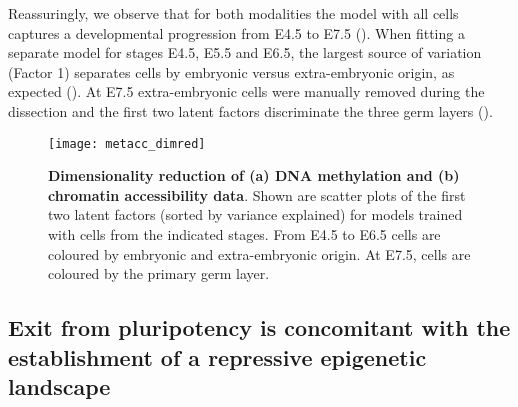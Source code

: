 
Reassuringly, we observe that for both modalities the model with all cells captures a developmental progression from E4.5 to E7.5 (). When fitting a separate model for stages E4.5, E5.5 and E6.5, the largest source of variation (Factor 1) separates cells by embryonic versus extra-embryonic origin, as expected (). At E7.5 extra-embryonic cells were manually removed during the dissection and the first two latent factors discriminate the three germ layers ().

\begin{figure}[H]
	\centering
	\texttt{[image: metacc\_dimred]}
	\caption[]{
 	\textbf{Dimensionality reduction of (a) DNA methylation and (b) chromatin accessibility data}. Shown are scatter plots of the first two latent factors (sorted by variance explained) for models trained with cells from the indicated stages. From E4.5 to E6.5 cells are coloured by embryonic and extra-embryonic origin. At E7.5, cells are coloured by the primary germ layer. 
	}
	\label{fig:metacc_dimred}
\end{figure}

\subsection{Exit from pluripotency is concomitant with the establishment of a repressive epigenetic landscape}

